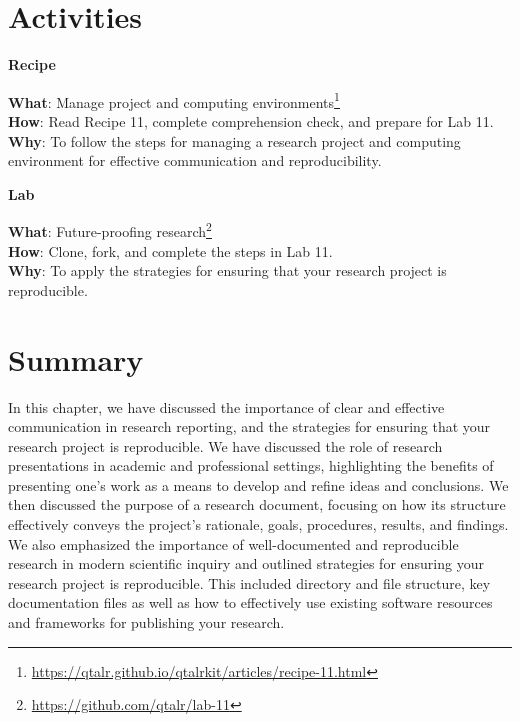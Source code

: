 \documentclass[
  letterpaper,
]{latex/krantz}
\theoremstyle{definition}
\theoremstyle{remark}
\DeclareRobustCommand{\href}[2]{#2\footnote{\url{#1}}}
\begin{document}
\section*{Activities}\label{activities-9}


\begin{tcolorbox}[enhanced jigsaw, colback=white, colframe=quarto-callout-color-frame, leftrule=.75mm, opacityback=0, rightrule=.15mm, bottomrule=.15mm, toprule=.15mm, breakable, left=2mm, arc=.35mm]

\textbf{ Recipe}

\textbf{What}:
\href{https://qtalr.github.io/qtalrkit/articles/recipe-11.html}{Manage
project and computing environments}\\
\textbf{How}: Read Recipe 11, complete comprehension check, and prepare
for Lab 11.\\
\textbf{Why}: To follow the steps for managing a research project and
computing environment for effective communication and reproducibility.

\end{tcolorbox}

\begin{tcolorbox}[enhanced jigsaw, colback=white, colframe=quarto-callout-color-frame, leftrule=.75mm, opacityback=0, rightrule=.15mm, bottomrule=.15mm, toprule=.15mm, breakable, left=2mm, arc=.35mm]

\textbf{ Lab}

\textbf{What}: \href{https://github.com/qtalr/lab-11}{Future-proofing
research}\\
\textbf{How}: Clone, fork, and complete the steps in Lab 11.\\
\textbf{Why}: To apply the strategies for ensuring that your research
project is reproducible.

\end{tcolorbox}

\section*{Summary}\label{summary-10}


In this chapter, we have discussed the importance of clear and effective
communication in research reporting, and the strategies for ensuring
that your research project is reproducible. We have discussed the role
of research presentations in academic and professional settings,
highlighting the benefits of presenting one's work as a means to develop
and refine ideas and conclusions. We then discussed the purpose of a
research document, focusing on how its structure effectively conveys the
project's rationale, goals, procedures, results, and findings. We also
emphasized the importance of well-documented and reproducible research
in modern scientific inquiry and outlined strategies for ensuring your
research project is reproducible. This included directory and file
structure, key documentation files as well as how to effectively use
existing software resources and frameworks for publishing your research.
\end{document}
